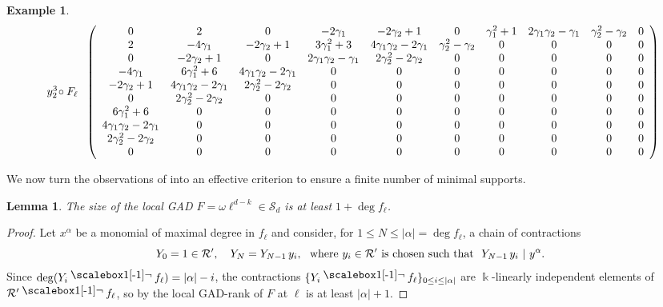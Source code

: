 \documentclass{amsart}
\theoremstyle{plain}
\newtheorem{lemma}[lemma]{Lemma}
\newtheorem{example}[example]{Example}
\renewcommand{\k}{\Bbbk}
\renewcommand{\S}{\mathcal{S}}
\def\a{\alpha}
\newcommand{\contract}{\mathbin{\mathpalette\dointprod\relax}}
\newcommand{\dointprod}[2]{%
  \raisebox{\depth}{\scalebox{1}[-1]{$#1\lnot$}}}
\def\\k{{\mathsf{k}}}
\def\R{\mathcal{R}}
\numberwithin{equation}{section}
\begin{document}
\begin{example}
\[\begin{array}{c@{\;}c}
\begin{array}{c}
y_2^3\!\circ F_\ell
\end{array}
&
\left(
\begin{array}{cccccccccc}
0 & 2 & 0 & -2\gamma_1 & -2\gamma_2+1 & 0 & \gamma_1^2+1 & 2\gamma_1\gamma_2-\gamma_1 & \gamma_2^2-\gamma_2 & 0 \\
2 & -4\gamma_1 & -2\gamma_2+1 & 3\gamma_1^2+3 & 4\gamma_1\gamma_2-2\gamma_1 & \gamma_2^2-\gamma_2 & 0 & 0 & 0 & 0 \\
0 & -2\gamma_2+1 & 0 & 2\gamma_1\gamma_2-\gamma_1 & 2\gamma_2^2-2\gamma_2 & 0 & 0 & 0 & 0 & 0 \\
-4\gamma_1 & 6\gamma_1^2+6 & 4\gamma_1\gamma_2-2\gamma_1 & 0 & 0 & 0 & 0 & 0 & 0 & 0 \\
-2\gamma_2+1 & 4\gamma_1\gamma_2-2\gamma_1 & 2\gamma_2^2-2\gamma_2 & 0 & 0 & 0 & 0 & 0 & 0 & 0 \\
0 & 2\gamma_2^2-2\gamma_2 & 0 & 0 & 0 & 0 & 0 & 0 & 0 & 0 \\
6\gamma_1^2+6 & 0 & 0 & 0 & 0 & 0 & 0 & 0 & 0 & 0 \\
4\gamma_1\gamma_2-2\gamma_1 & 0 & 0 & 0 & 0 & 0 & 0 & 0 & 0 & 0 \\
2\gamma_2^2-2\gamma_2 & 0 & 0 & 0 & 0 & 0 & 0 & 0 & 0 & 0 \\
0 & 0 & 0 & 0 & 0 & 0 & 0 & 0 & 0 & 0
\end{array}
\right)
\end{array}
\]
\end{example}
\fi

We now turn the observations of  into an effective criterion to ensure a finite number of minimal supports.

\begin{lemma} \label{lem:degfL}
    The size of the local GAD $F = \omega\ell^{d-k} \in \S_d$ is at least $1+\deg f_{\ell}$.
\end{lemma}
\begin{proof}
    Let $x^{\a}$ be a monomial of maximal degree in $f_{\ell}$ and consider, for $1 \leq N \leq |\a| = \deg f_{\ell}$, a chain of contractions
    \[ Y_0 = 1 \in \R', \quad Y_{N} = Y_{N-1}\,y_i, \ \textnormal{ where } y_i \in \R' \textnormal{ is chosen such that } \ Y_{N-1}\,y_i \ | \ y^{\a}. \]
    Since $\deg (Y_i \contract f_{\ell}) = |\a|-i$, the contractions $\{Y_i \contract f_{\ell} \}_{0 \leq i \leq |\a|}$ are $\k$-linearly independent elements of $\R' \contract f_{\ell}$, so by  the local GAD-rank of $F$ at $\ell$ is at least $|\a|+1$.
\end{proof}
\end{document}
